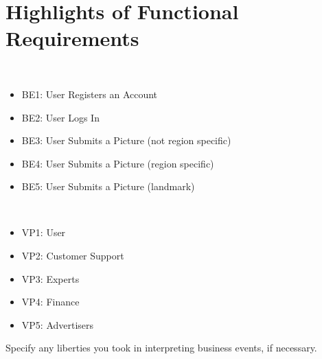 \documentclass[]{article}
\begin{document}
%
%
%

\section{Highlights of Functional Requirements}
\label{sec:functional_requirements}

 \\
\begin{itemize}
    \item BE1: User Registers an Account 
    \item BE2: User Logs In 
    \item BE3: User Submits a Picture (not region specific)
    \item BE4: User Submits a Picture (region specific)
    \item BE5: User Submits a Picture (landmark) \\
    
\end{itemize}

 \\
\begin{itemize}
    \item VP1: User
    \item VP2: Customer Support
    \item VP3: Experts
    \item VP4: Finance 
    \item VP5: Advertisers\\
\end{itemize}

 Specify any liberties you took in interpreting business events, if necessary.\\
\end{document}
